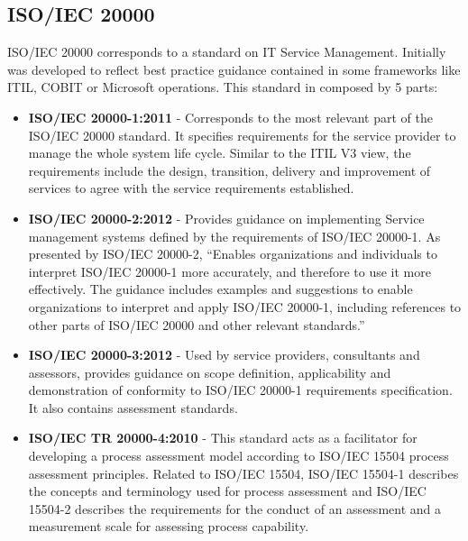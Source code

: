 \subsection{ISO/IEC 20000}

ISO/IEC 20000 corresponds to a standard on IT Service Management. Initially was developed to reflect best practice guidance contained in some frameworks like ITIL, COBIT or Microsoft operations. This standard in composed by 5 parts:

\begin{itemize}
  \item \textbf{ISO/IEC 20000-1:2011} -  Corresponds to the most relevant part of the ISO/IEC 20000 standard. It specifies requirements for the service provider to manage the whole system life cycle. Similar to the ITIL V3 view, the requirements include the design, transition, delivery and improvement of services to agree with the service requirements established.\cite{ISO20000-1}\par
  
  \vspace{5mm}
  
  \item \textbf{ISO/IEC 20000-2:2012} - Provides guidance on implementing Service management systems defined by the requirements of ISO/IEC 20000-1. As presented by ISO/IEC 20000-2, ``Enables organizations and individuals to interpret ISO/IEC 20000-1 more accurately, and therefore to use it more effectively. The guidance includes examples and suggestions to enable organizations to interpret and apply ISO/IEC 20000-1, including references to other parts of ISO/IEC 20000 and other relevant standards.''\cite{ISO20000-2}\par
  
  \vspace{5mm}
  
  \item \textbf{ISO/IEC 20000-3:2012} - Used by service providers, consultants and assessors, provides guidance on scope definition, applicability and demonstration of conformity to ISO/IEC 20000-1 requirements specification. It also contains assessment standards.\cite{ISO20000-3}\par
  \vspace{5mm}
  
  \item \textbf{ISO/IEC TR 20000-4:2010} - This standard acts as a facilitator for developing a process assessment model according to ISO/IEC 15504 process assessment principles. Related to ISO/IEC 15504, ISO/IEC 15504-1 describes the concepts and terminology used for process assessment and ISO/IEC 15504-2 describes the requirements for the conduct of an assessment and a measurement scale for assessing process capability.\cite{ISO20000-4}\par
  

\end{itemize}

